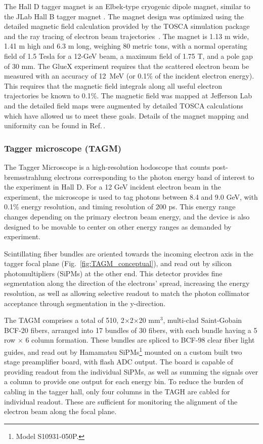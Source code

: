 The Hall D tagger magnet is an Elbek-type cryogenic dipole magnet, similar to the JLab Hall B tagger magnet \cite{BORGGREEN19631, Sober2000263}. The magnet design was optimized using the detailed magnetic field calculation 
provided by the TOSCA simulation package and the ray tracing of electron beam trajectories~\cite{DIPOLE_YANG,DIPOLE_SOMOV}.
The magnet is 1.13 m wide, 1.41 m high and 6.3 m long, weighing 80 metric tons, with a normal operating field of 1.5 Tesla for a  12-GeV beam, a maximum field of 1.75 T, and a pole gap of 30 mm. The GlueX experiment requires that the scattered electron beam be measured with an accuracy of 12~MeV (or 0.1\% of the incident electron energy). This requires that the magnetic field integrals along all useful electron trajectories be known to 0.1\%. The magnetic field was mapped at Jefferson Lab and the detailed field maps were augmented by detailed TOSCA calculations which have allowed us to meet these goals. Details of the magnet mapping and uniformity can be found in Ref.\,\cite{gx4271}.


\subsubsection{Tagger microscope (TAGM)}\label{sec:TAGM}
The Tagger Microscope is a high-resolution hodoscope that counts post-bremsstrahlung electrons corresponding to the photon energy band of interest to the experiment in Hall D.
For a 12 GeV incident electron beam in the \GX{} experiment, the microscope is used to tag photons between 8.4 and 9.0 GeV, with 0.1\% energy resolution, and timing resolution of 200 ps.
This energy range changes depending on the primary electron beam energy, and the device is also designed to be movable to center on other energy ranges as demanded by experiment.

Scintillating fiber bundles are oriented towards the incoming electron axis in the tagger focal plane (Fig.~\ref{fig:TAGM_conceptual}), and read out by silicon photomultipliers (SiPMs) at the other end.
This detector provides fine segmentation along the direction of the electrons' spread, increasing the energy resolution, as well as allowing selective readout to match the photon collimator acceptance through segmentation in the y-direction.

The TAGM comprises a total of 510, 2$\times$2$\times$20 mm$^3$, multi-clad Saint-Gobain BCF-20 fibers, arranged into 17 bundles of 30 fibers, with each bundle having a 5 row $\times$ 6 column formation. These bundles are spliced to BCF-98 clear fiber light guides, and read out by Hamamatsu SiPMs\footnote{Model S10931-050P.} mounted on a custom built two stage preamplifier board, with flash ADC output.
The board is capable of providing readout from the individual SiPMs, as well as summing the signals over a column to provide one output for each energy bin.
To reduce the burden of cabling in the tagger hall, only four columns in the TAGH are cabled for individual readout.
These are sufficient for monitoring the alignment of the electron beam along the focal plane.

